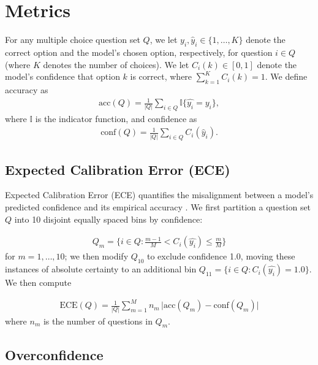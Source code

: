 \documentclass{article}
\begin{document}
\renewcommand{\arraystretch}{1.3}


\section{Metrics}

For any multiple choice question set $Q$, we let
$y_i,\hat y_i \in \{1,\ldots,K\}$ denote the correct option and the model's chosen option, respectively, for question $i\in Q$ (where $K$ denotes the number of choices).  We let $C_i(k)\in[0,1]$ denote the model's confidence that option $k$ is correct, where $\sum_{k=1}^KC_i(k)=1$.
We define accuracy as
\begin{align}
    \text{acc}(Q) = \frac{1}{|Q|}\sum_{i\in Q}\mathbb{I}\{\hat{y_i}=y_i\},
\end{align}
where $\mathbb{I}$ is the indicator function, and confidence as
\begin{align}
    \text{conf}(Q) = \frac{1}{|Q|}\sum_{i\in Q}C_i(\hat{y}_i).
\end{align}

\subsection{Expected Calibration Error (ECE)}

Expected Calibration Error (ECE) quantifies the misalignment between a model's predicted confidence and its empirical accuracy \citep{Pavlovic_2025,Naeini_Cooper_Hauskrecht_2015}. 
We first partition a question set $Q$ 
into 10 disjoint equally spaced bins by confidence:

\begin{align*}
    Q_m = \bigl\{i\in Q:  \frac{m-1}{M} < C_i (\hat{y_i })\leq \frac{m}{M} \bigr\}
\end{align*}
for $m=1,\ldots,10$; we then modify $Q_{10}$ to exclude confidence 1.0, moving these instances of absolute certainty to an additional bin $Q_{11}=\{i\in Q: C_i (\hat{y_i })=1.0\}$.
We then compute

\begin{align}
    \text{ECE}(Q) = \frac{1}{|Q|}\sum_{m=1}^M n_m  \,\bigl| \text{acc}(Q_m) - \text{conf}(Q_m)\bigr|
\end{align}
where $n_m$ is the number of questions in $Q_m$. 
\subsection{Overconfidence}
\end{document}
